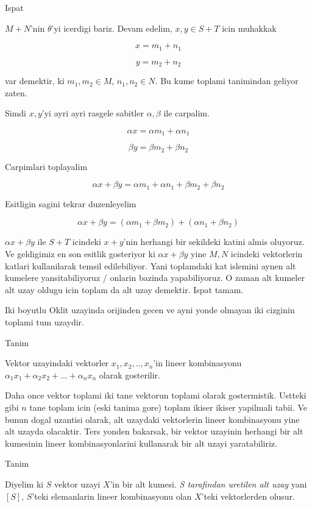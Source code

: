 \documentclass[12pt,fleqn]{article}\usepackage{../common}
\begin{document}
Ispat 

$M+N$'nin $\theta$'yi icerdigi bariz. Devam edelim, $x,y \in S+T$ icin
muhakkak 

\[ x = m_1 + n_1 \]

\[ y = m_2 + n_2 \]

var demektir, ki $m_1,m_2 \in M$, $n_1,n_2 \in N$. Bu kume toplami
tanimindan geliyor zaten. 

Simdi $x,y$'yi ayri ayri rasgele sabitler $\alpha,\beta$ ile carpalim. 

\[ \alpha x = \alpha m_1 + \alpha n_1 \]

\[ \beta y = \beta m_2 + \beta n_2 \]

Carpimlari toplayalim

\[ \alpha x + \beta y  = \alpha m_1 + \alpha n_1 + \beta m_2 + \beta n_2 \]

Esitligin sagini tekrar duzenleyelim

\[ \alpha x + \beta y  = (\alpha m_1 + \beta m_2) + (\alpha n_1  + \beta n_2 )\]

$\alpha x + \beta y $ ile $S+T$ icindeki $x+y$'nin herhangi bir sekildeki
katini almis oluyoruz. Ve geldigimiz en son esitlik gosteriyor 
ki $\alpha x
+ \beta y$ yine $M,N$ icindeki vektorlerin katlari kullanilarak 
temsil edilebiliyor. Yani toplamdaki kat islemini aynen alt kumelere
yansitabiliyoruz / onlarin bazinda yapabiliyoruz. O zaman alt kumeler alt
uzay oldugu icin toplam da alt uzay demektir. Ispat tamam.

Iki boyutlu Oklit uzayinda orijinden gecen ve ayni yonde olmayan iki cizginin
toplami tum uzaydir. 

Tanim

Vektor uzayindaki vektorler $x_1,x_2,..,x_n$'in lineer kombinasyonu
$\alpha_1 x_1 + \alpha_2 x_2 + ... + \alpha_n x_n$ olarak gosterilir. 

Daha once vektor toplami iki tane vektorun toplami olarak
gostermistik. Ustteki gibi $n$ tane toplam icin (eski tanima gore) toplam
ikiser ikiser yapilmali tabii. Ve bunun dogal uzantisi olarak, alt
uzaydaki vektorlerin lineer kombinasyonu yine alt uzayda olacaktir. Ters
yonden bakarsak, bir vektor uzayinin herhangi bir alt kumesinin lineer
kombinasyonlarini kullanarak bir alt uzayi yaratabiliriz. 

Tanim

Diyelim ki $S$ vektor uzayi $X$'in bir alt kumesi. {\em S tarafindan
  uretilen alt uzay} yani $[S]$, $S$'teki elemanlarin lineer
kombinasyonu olan $X$'teki vektorlerden olusur. 
\end{document}

